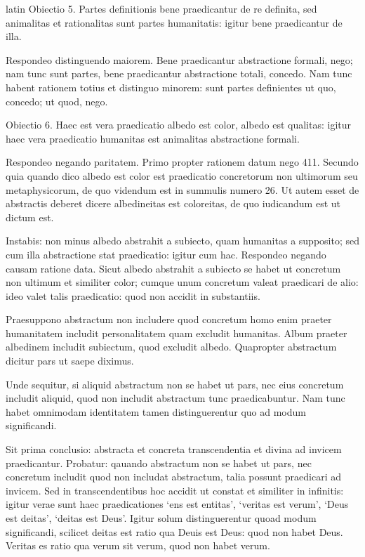 \begin{otherlanguage*}{latin}
\pstart
Obiectio 5. Partes definitionis bene praedicantur de re definita, sed animalitas et rationalitas sunt partes humanitatis:
igitur bene praedicantur de illa. 
\pend

\pstart
Respondeo distinguendo maiorem. Bene praedicantur abstractione formali, nego; nam tunc sunt partes, bene praedicantur abstractione totali, concedo. Nam tunc habent rationem totius et distinguo minorem:
sunt partes definientes ut quo, concedo; ut quod, nego. 
\pend

\pstart
Obiectio 6. Haec est vera praedicatio albedo est color, albedo est qualitas:
igitur haec vera praedicatio humanitas est animalitas abstractione formali. 
\pend

\pstart
Respondeo negando paritatem. Primo propter rationem datum nego 411. Secundo quia quando dico albedo est color est praedicatio concretorum non ultimorum seu metaphysicorum, de quo videndum est in summulis numero 26. Ut autem esset de abstractis deberet dicere albedineitas est coloreitas, de quo iudicandum est ut dictum est. 
\pend

\pstart
Instabis:
non minus albedo abstrahit a subiecto, quam humanitas a supposito; sed cum illa abstractione stat praedicatio:
igitur cum hac. Respondeo negando causam ratione data. Sicut albedo abstrahit a subiecto se habet ut concretum non ultimum et similiter color; cumque unum concretum valeat praedicari de alio:
ideo valet talis praedicatio:
quod non accidit in substantiis. 
\pend

\pstart
{}
\pend

\pstart
Praesuppono abstractum non includere quod concretum homo enim praeter humanitatem includit personalitatem quam excludit humanitas. Album praeter albedinem includit subiectum, quod excludit albedo. Quapropter abstractum dicitur pars ut saepe diximus. 
\pend

\pstart
Unde sequitur, si aliquid abstractum non se habet ut pars, nec eius concretum includit aliquid, quod non includit abstractum tunc praedicabuntur. Nam tunc habet omnimodam identitatem tamen distinguerentur quo ad modum significandi. 
\pend

\pstart
Sit prima conclusio:
abstracta et concreta transcendentia et divina ad invicem praedicantur. Probatur:
qauando abstractum non se habet ut pars, nec concretum includit quod non includat abstractum, talia possunt praedicari ad invicem. Sed in transcendentibus hoc accidit ut constat et similiter in infinitis:
igitur verae sunt haec praedicationes `ens est entitas', `veritas est verum', `Deus est deitas', `deitas est Deus'. Igitur solum distinguerentur quoad modum significandi, scilicet deitas est ratio qua Deuis est Deus:
quod non habet Deus. Veritas es ratio qua verum sit verum, quod non habet verum. 
\pend


\end{otherlanguage*}
